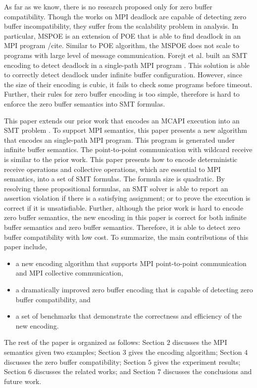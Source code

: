 As far as we know, there is no research proposed only for zero buffer compatibility. Though the works on MPI deadlock \cite{} are capable of detecting zero buffer incompatibility, they suffer from the scalability problem in analysis. In particular, MSPOE is an extension of POE that is able to find deadlock in an MPI program /cite{}. Similar to POE algorithm, the MSPOE does not scale to programs with large level of message communication. Forejt et al. built an SMT encoding to detect deadlock in a single-path MPI program \cite{}. This solution is able to correctly detect deadlock under infinite buffer configuration. However, since the size of their encoding is cubic, it fails to check some programs before timeout. Further, their rules for zero buffer encoding is too simple, therefore is hard to enforce the zero buffer semantics into SMT formulas. 

This paper extends our prior work that encodes an MCAPI execution into an SMT problem \cite{DBLP:conf/kbse/HuangMM13}. To support MPI semantics, this paper presents a new algorithm that encodes an single-path MPI program. This program is generated under infinite buffer semantics. The point-to-point communication with wildcard receive is similar to the prior work. This paper presents how to encode deterministic receive operations and collective operations, which are essential to MPI semantics, into a set of SMT formulas. The formula size is quadratic. By resolving these propositional formulas, an SMT solver is able to report an assertion violation if there is a satisfying assignment; or to prove the execution is correct if it is unsatisfiable. Further, although the prior work \cite{DBLP:conf/kbse/HuangMM13} is hard to encode zero buffer semantics, the new encoding in this paper is correct for both infinite buffer semantics and zero buffer semantics. Therefore, it is able to detect zero buffer compatibility with low cost. To summarize, the main contributions of this paper include,
\begin{itemize}
\item a new encoding algorithm that supports MPI point-to-point communication and MPI collective communication,
\item a dramatically improved zero buffer encoding that is capable of detecting zero buffer compatibility, and
\item a set of benchmarks that demonstrate the correctness and efficiency of the new encoding.
\end{itemize}

The rest of the paper is organized as follows: Section $2$ discusses the MPI semantics given two examples; Section $3$ gives the encoding algorithm; Section $4$ discusses the zero buffer compatibility; Section $5$ gives the experiment results; Section $6$ discusses the related works; and Section $7$ discusses the conclusions and future work.

\examplefigone


           